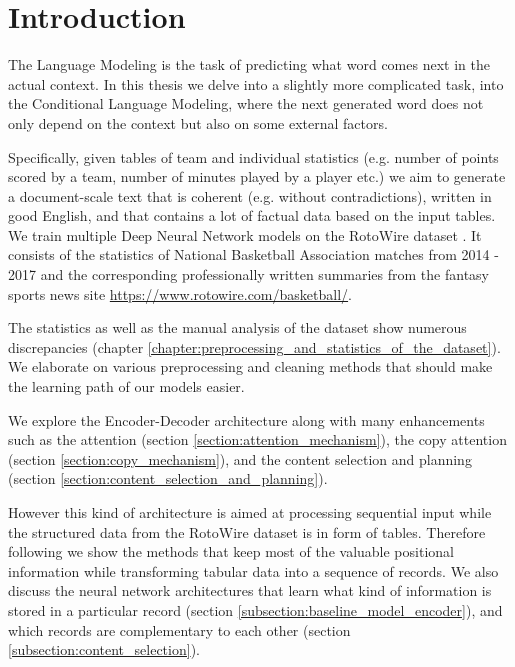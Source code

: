 \chapter*{Introduction} \label{chapter:introduction}

The Language Modeling is the task of predicting what word comes next in the actual context. In this thesis we delve into a slightly more complicated task, into the Conditional Language Modeling, where the next generated word does not only depend on the context but also on some external factors.

Specifically, given tables of team and individual statistics (e.g. number of points scored by a team,  number of minutes played by a player etc.) we aim to generate a document-scale text that is coherent (e.g. without contradictions), written in good English, and that contains a lot of factual data based on the input tables. We train multiple Deep Neural Network models on the RotoWire dataset \citep{wiseman2017}. It consists of the statistics of National Basketball Association matches from 2014 - 2017 and the corresponding professionally written summaries from the fantasy sports news site \url{https://www.rotowire.com/basketball/}.

The statistics as well as the manual analysis of the dataset show numerous discrepancies (chapter \ref{chapter:preprocessing_and_statistics_of_the_dataset}). We elaborate on various preprocessing and cleaning methods that should make the learning path of our models easier.

We explore the Encoder-Decoder architecture \citep{sutskever2014sequence} along with many enhancements such as the attention (section \ref{section:attention_mechanism}), the copy attention (section \ref{section:copy_mechanism}), and the content selection and planning (section \ref{section:content_selection_and_planning}).

However this kind of architecture is aimed at processing sequential input while the structured data from the RotoWire dataset is in form of tables. Therefore following \citet{wiseman2017} we show the methods that keep most of the valuable positional information while transforming tabular data into a sequence of records. We also discuss the neural network architectures that learn what kind of information is stored in a particular record (section \ref{subsection:baseline_model_encoder}), and which records are complementary to each other (section \ref{subsection:content_selection}).

